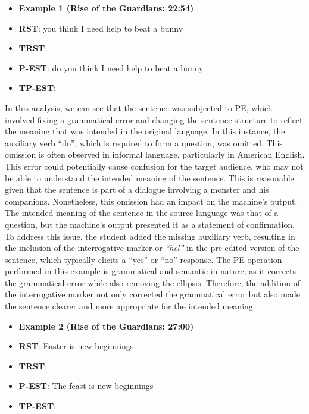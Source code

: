 \documentclass[english]{textolivre}
\begin{document}
\begin{itemize}
 \item \textbf{Example 1 (Rise of the Guardians: 22:54)}
 \item \textbf{RST}: you think I need help to beat a bunny
 \item \textbf{TRST}:  
 \item \textbf{P-EST}: do you think I need help to beat a bunny
 \item \textbf{TP-EST}: 
\end{itemize}

In this analysis, we can see that the sentence was subjected to PE, which involved fixing a grammatical error and changing the sentence structure to reflect the meaning that was intended in the original language. In this instance, the auxiliary verb “do”, which is required to form a question, was omitted. This omission is often observed in informal language, particularly in American English. This error could potentially cause confusion for the target audience, who may not be able to understand the intended meaning of the sentence. This is reasonable given that the sentence is part of a dialogue involving a monster and his companions. Nonetheless, this omission had an impact on the machine’s output. The intended meaning of the sentence in the source language was that of a question, but the machine’s output presented it as a statement of confirmation. To address this issue, the student added the missing auxiliary verb, resulting in the inclusion of the interrogative marker  or \emph{“hel”} in the pre-edited version of the sentence, which typically elicits a “yes” or “no” response. The PE operation performed in this example is grammatical and semantic in nature, as it corrects the grammatical error while also removing the ellipsis. Therefore, the addition of the interrogative marker not only corrected the grammatical error but also made the sentence clearer and more appropriate for the intended meaning.

\begin{itemize}
 \item \textbf{Example 2 (Rise of the Guardians: 27:00)}
 \item \textbf{RST}: Easter is new beginnings
 \item \textbf{TRST}: 
 \item \textbf{P-EST}: The feast is new beginnings
 \item \textbf{TP-EST}: 
\end{itemize}
\end{document}
